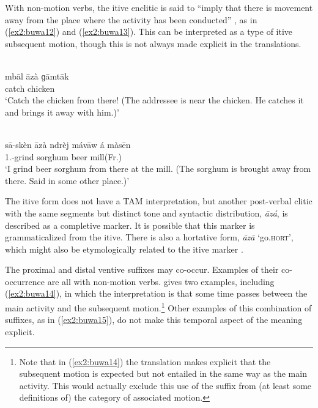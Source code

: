 With non-motion verbs, the itive enclitic is said to ``imply that there is movement away from the place where the activity has been conducted'' \citep[378]{viljoenGrammaticalDescriptionBuwal2013}, as in (\ref{ex2:buwa12}) and (\ref{ex2:buwa13}). This can be interpreted as a type of itive subsequent motion, though this is not always made explicit in the translations. 

\ea\label{ex2:buwa12}
 \\
\gll mbāl āzà ɡāmtāk	\\
catch  chicken	\\
\glt `Catch the chicken from there! (The addressee is near the chicken. He catches it and brings it away with him.)'

\ex\label{ex2:buwa13}
 \\
\gll  sā-skèn āzà ndrèj mávāw á màsēn	\\
1.-grind  sorghum beer  mill(Fr.)		\\
\glt `I grind beer sorghum from there at the mill. (The sorghum is brought away from there. Said in some other place.)'
\z 

The itive form does not have a TAM interpretation, but another post-verbal clitic with the same segments but distinct tone and syntactic distribution, \textit{āzá}, is described as a completive marker. It is possible that this marker is grammaticalized from the itive. There is also a hortative form, \textit{āzā} ‘go.\textsc{hort}’, which might also be etymologically related to the itive marker \citep[471--472]{viljoenGrammaticalDescriptionBuwal2013}. 

The proximal and distal ventive suffixes may co-occur. Examples of their co-occurrence are all with non-motion verbs. \citet[377]{viljoenGrammaticalDescriptionBuwal2013} gives two examples, including (\ref{ex2:buwa14}), in which the interpretation is that some time passes between the main activity and the subsequent motion.\footnote{Note that in (\ref{ex2:buwa14}) the translation makes explicit that the subsequent motion is expected but not entailed in the same way as the main activity. This would actually exclude this use of the suffix from (at least some definitions of) the category of associated motion.} Other examples of this combination of suffixes, as in (\ref{ex2:buwa15}), do not make this temporal aspect of the meaning explicit. 

